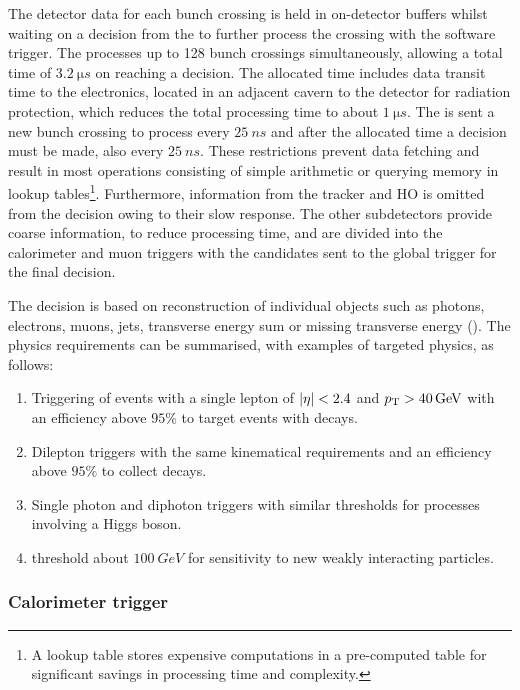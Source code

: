 The detector data for each bunch crossing is held in on-detector buffers whilst waiting on a decision from the \HWT to further process the crossing with the software trigger. The \HWT processes up to 128 bunch crossings simultaneously, allowing a total time of ${\SI{3.2}{\micro s}}$ on reaching a decision. The allocated time includes data transit time to the electronics, located in an adjacent cavern to the detector for radiation protection, which reduces the total processing time to about ${\SI{1}{\micro s}}$. The \HWT is sent a new bunch crossing to process every ${\SI{25}{ns}}$ and after the allocated time a decision must be made, also every ${\SI{25}{ns}}$. These restrictions prevent data fetching and result in most operations consisting of simple arithmetic or querying memory in lookup tables\footnote{A lookup table stores expensive computations in a pre-computed table for significant savings in processing time and complexity.}. Furthermore, information from the tracker and HO is omitted from the \HWT decision owing to their slow response. The other subdetectors provide coarse information, to reduce processing time, and are divided into the calorimeter and muon triggers with the candidates sent to the global trigger for the final decision.

The \HWT decision is based on reconstruction of individual objects such as photons, electrons, muons, jets, transverse energy sum or missing transverse energy (\etmiss). The physics requirements can be summarised, with examples of targeted physics, as follows:

\begin{enumerate}
    \item Triggering of events with a single lepton of ${|\eta|<2.4}$ and ${p_{\text{T}}>\SI{40}{GeV}}$ with an efficiency above $95\%$ to target events with \PW decays.
    \item Dilepton triggers with the same kinematical requirements and an efficiency above $95\%$ to collect \PZ decays.
    \item Single photon and diphoton triggers with similar thresholds for processes involving a Higgs boson.
    \item \etmiss threshold about ${\SI{100}{GeV}}$ for sensitivity to new weakly interacting particles.
\end{enumerate}


\subsubsection{Calorimeter trigger}

